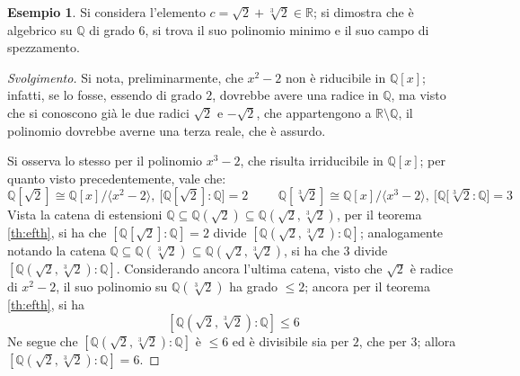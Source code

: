 \documentclass[11pt, a4paper]{scrartcl}
\newenvironment{svolgimento}{\renewcommand\qedsymbol{$\blacksquare$}\begin{proof}[Svolgimento]}{\end{proof}}
\theoremstyle{definition}
\newtheorem{esempio}{Esempio}
\numberwithin{esempio}{section}
\theoremstyle{definition}
\numberwithin{obs}{section}
\numberwithin{nota}{section}
\numberwithin{equation}{subsection}
\begin{document}
\begin{esempio}
	Si considera l'elemento $c = \sqrt{2}  + \sqrt[3]{2} \in \mathbb{R}$; si dimostra che \`e algebrico su $\mathbb{Q}$ di grado $6$, si trova il suo polinomio minimo e il suo campo di spezzamento.
	\begin{svolgimento}
		Si nota, preliminarmente, che $x^2 - 2$ non \`e riducibile in $\mathbb{Q}[x]$; infatti, se lo fosse, essendo di grado $2$, dovrebbe avere una radice in $\mathbb{Q}$, ma visto che si conoscono gi\`a le due radici $\sqrt{2} $ e $-\sqrt{2} $, che appartengono a $\mathbb{R} \setminus\mathbb{Q}$, il polinomio dovrebbe averne una terza reale, che \`e assurdo.

		Si osserva lo stesso per il polinomio $x^3 - 2$, che risulta irriducibile in $\mathbb{Q}[x]$; per quanto visto precedentemente, vale che:
		\[
			\mathbb{Q}[\sqrt{2} ] \cong \mathbb{Q}[x] / \langle x^2 - 2 \rangle, \ \big[\mathbb{Q}[\sqrt{2} ] : \mathbb{Q}\big] = 2 \hspace{1cm}\mathbb{Q}[\sqrt[3]{2} ] \cong \mathbb{Q}[x] / \langle x^3 - 2 \rangle, \ \big[\mathbb{Q}[\sqrt[3]{2} : \mathbb{Q}\big]=3
		\] 
		Vista la catena di estensioni $\mathbb{Q}\subseteq \mathbb{Q}(\sqrt{2} ) \subseteq \mathbb{Q}(\sqrt{2} , \sqrt[3]{2} )$, per il teorema \ref{th:efth}, si ha che $[\mathbb{Q}[\sqrt{2}] :\mathbb{Q}] = 2 $ divide $[\mathbb{Q}(\sqrt{2} ,\sqrt[3]{2} ) : \mathbb{Q}]$; analogamente notando la catena $\mathbb{Q}\subseteq \mathbb{Q}(\sqrt[3]{2} ) \subseteq \mathbb{Q}(\sqrt{2} ,\sqrt[3]{2} )$, si ha che $3 $ divide $ [\mathbb{Q}(\sqrt{2} ,\sqrt[3]{2} ) : \mathbb{Q}]$.
		Considerando ancora l'ultima catena, visto che $\sqrt{2} $ \`e radice di $x^2 - 2$, il suo polinomio su $\mathbb{Q}(\sqrt[3]{2} )$ ha grado $\le 2$; ancora per il teorema \ref{th:efth}, si ha 
		\[
			[\mathbb{Q}(\sqrt{2} ,\sqrt[3]{2} ):\mathbb{Q}]\le 6
		\] 
		Ne segue che $[\mathbb{Q}(\sqrt{2} ,\sqrt[3]{2} ):\mathbb{Q}]$ \`e $\le 6$ ed \`e divisibile sia per $2$, che per $3$; allora $[\mathbb{Q}(\sqrt{2} ,\sqrt[3]{2} ):\mathbb{Q}]=6$.


\end{svolgimento}
\end{esempio}
\end{document}
